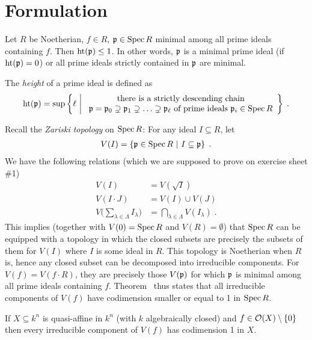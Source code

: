 \documentclass[a4paper,parskip=half,numbers=enddot, DIV=12, headheight=30pt]{scrreprt}
\begin{document}
\section{Formulation}
\setcounter{thm}{10}
\begin{thm}
    Let $R$ be Noetherian, $f\in R$, $\mathfrak{p}\in \operatorname{Spec} R$ minimal among all prime ideals containing $f$. Then $\operatorname{ht}(\mathfrak{p}) \leq 1$. In other words, $\mathfrak{p}$ is a minimal prime ideal (if $\operatorname{ht}(\mathfrak{p}) =0$) or all prime ideals strictly contained in $\mathfrak{p}$ are minimal.
\end{thm}
\begin{rem*}
    \begin{alphanumerate}
    \item
        The \emph{height} of a prime ideal is defined as
        \begin{align*}
            \operatorname{ht}(\mathfrak{p}) = \sup\left\{\ell\ \middle|\ 
            \begin{array}{c}
	            \text{there is a strictly descending chain}\\
	            \mathfrak{p}=\mathfrak{p}_0\supsetneq\mathfrak{p}_1\supsetneq\ldots\supsetneq\mathfrak{p}_\ell\text{ of prime ideals }\mathfrak{p}_i\in\operatorname{Spec} R
            \end{array}\right\}\;.
        \end{align*}
    \item
        Recall the \emph{Zariski topology} on $\operatorname{Spec} R$: For any ideal $I\subseteq R$, let 
        \begin{align*}
        	V(I) = \left\{\mathfrak{p}\in\operatorname{Spec} R\ \middle|\  I\subseteq \mathfrak{p}\right\}\;.
        \end{align*}
        We have the following relations (which we are supposed to prove on exercise sheet \#1)
        \begin{align*}
            V(I)& = V\left(\sqrt{I}\right)\\
            V(I\cdot J ) &= V(I) \cup V(J)\\
            V\bigg(\sum_{\lambda\in\Lambda} I_\lambda\bigg) &= \bigcap_{\lambda\in\Lambda} V(I_\lambda)\;.
        \end{align*}
        This implies (together with $V(0) = \operatorname{Spec} R$ and $V(R) = \emptyset$) that $\operatorname{Spec} R$ can be equipped with a topology in which the closed subsets are precisely the subsets of them for $V(I)$ where $I$ is some ideal in $R$. This topology is Noetherian when $R$ is, hence any closed subset can be decomposed into irreducible components. For $V(f) = V(f\cdot R)$, they are precisely those $V(\mathfrak{p})$ for which $\mathfrak{p}$ is minimal among all prime ideals containing $f$. Theorem~ thus states that all irreducible components of $V(f)$ have codimension smaller or equal to 1 in $\operatorname{Spec} R$. 
    \end{alphanumerate}
\end{rem*}
\begin{cor}
    If $X\subseteq k^n$ is quasi-affine in $k^n$ (with $k$ algebraically closed) and $f\in\mathcal{O}(X)\setminus\{0\}$ then every irreducible component of $V(f)$ has codimension 1 in $X$.
\end{cor}
\end{document}
